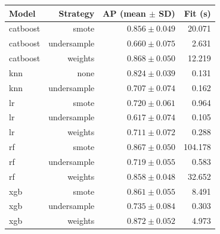 \begin{tabular}{lrrr}
\toprule
Model & Strategy & AP (mean $\pm$ SD) & Fit (s) \\
\midrule
catboost & smote & $0.856 \pm 0.049$ & 20.071 \\
catboost & undersample & $0.660 \pm 0.075$ & 2.631 \\
catboost & weights & $0.868 \pm 0.050$ & 12.219 \\
knn & none & $0.824 \pm 0.039$ & 0.131 \\
knn & undersample & $0.707 \pm 0.074$ & 0.162 \\
lr & smote & $0.720 \pm 0.061$ & 0.964 \\
lr & undersample & $0.617 \pm 0.074$ & 0.105 \\
lr & weights & $0.711 \pm 0.072$ & 0.288 \\
rf & smote & $0.867 \pm 0.050$ & 104.178 \\
rf & undersample & $0.719 \pm 0.055$ & 0.583 \\
rf & weights & $0.858 \pm 0.048$ & 32.652 \\
xgb & smote & $0.861 \pm 0.055$ & 8.491 \\
xgb & undersample & $0.735 \pm 0.084$ & 0.303 \\
xgb & weights & $0.872 \pm 0.052$ & 4.973 \\
\bottomrule
\end{tabular}
